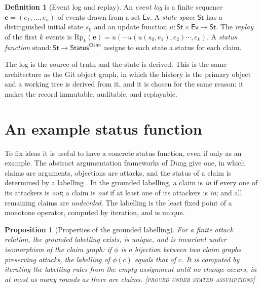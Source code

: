 \documentclass[11pt,twoside,openright]{book}
\theoremstyle{plain}
\newtheorem{proposition}[theorem]{Proposition}
\theoremstyle{definition}
\newtheorem{definition}[theorem]{Definition}
\theoremstyle{remark}
\newcommand{\Proved}{\textup{\textsc{[proved under stated assumptions]}}}
\begin{document}
\begin{definition}[Event log and replay]\label{def:log}
An \emph{event log} is a finite sequence $\mathbf{e}=(e_1,\dots,e_n)$ of events drawn from a set $\mathsf{Ev}$. A \emph{state space} $\mathsf{St}$ has a distinguished initial state $s_0$ and an update function $u:\mathsf{St}\times\mathsf{Ev}\to\mathsf{St}$. The \emph{replay} of the first $k$ events is $\mathrm{Rp}_k(\mathbf{e})=u(\cdots u(u(s_0,e_1),e_2)\cdots,e_k)$. A \emph{status function} $\mathrm{stand}:\mathsf{St}\to\mathsf{Status}^{\mathsf{Claim}}$ assigns to each state a status for each claim.
\end{definition}

The log is the source of truth and the state is derived. This is the same architecture as the Git object graph, in which the history is the primary object and a working tree is derived from it, and it is chosen for the same reason: it makes the record immutable, auditable, and replayable.

\section{An example status function}

To fix ideas it is useful to have a concrete status function, even if only as an example. The abstract argumentation frameworks of Dung give one, in which claims are arguments, objections are attacks, and the status of a claim is determined by a labelling \cite{dung1995}. In the grounded labelling, a claim is \emph{in} if every one of its attackers is \emph{out}; a claim is \emph{out} if at least one of its attackers is \emph{in}; and all remaining claims are \emph{undecided}. The labelling is the least fixed point of a monotone operator, computed by iteration, and is unique.

\begin{proposition}[Properties of the grounded labelling]\label{prop:grounded}
For a finite attack relation, the grounded labelling exists, is unique, and is invariant under isomorphism of the claim graph: if $\phi$ is a bijection between two claim graphs preserving attacks, the labelling of $\phi(c)$ equals that of $c$. It is computed by iterating the labelling rules from the empty assignment until no change occurs, in at most as many rounds as there are claims.
\Proved{}
\end{proposition}
\end{document}
